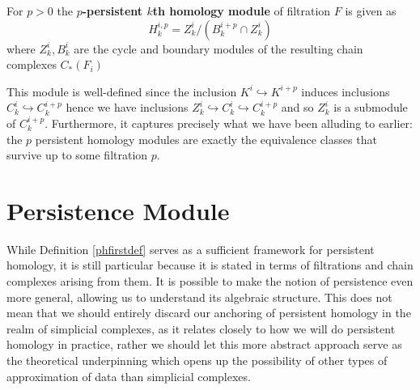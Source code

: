\begin{definition}\label{phfirstdef}
  For $p > 0$ the \textbf{$p$-persistent $k$th homology module} of filtration $F$ is given as
  \[H^{i,p}_{k} = Z^{i}_{k}/(B^{{i+p}}_{k} \cap Z^{i}_{k})\]
  where $Z^{i}_{k},B^{i}_{k}$ are the cycle and boundary modules of the resulting chain complexes $C_*(F_{i})$
\end{definition}
This module is well-defined since the inclusion $K^{i} \hookrightarrow K^{i+p}$ induces inclusions $C^{i}_{k} \hookrightarrow C_{k}^{i+p}$ hence we have inclusions $Z^{i}_{k} \hookrightarrow C^{i}_{k} \hookrightarrow C_{k}^{i+p}$ and so $Z^{i}_{k}$ is a submodule of $C^{i+p}_{k}$. Furthermore, it captures precisely what we have been alluding to earlier: the $p$ persistent homology modules are exactly the equivalence classes that survive up to some filtration $p$.


\section{Persistence Module}
While Definition \ref{phfirstdef} serves as a sufficient framework for persistent homology, it is still particular because it is stated in terms of filtrations and chain complexes arising from them. It is possible to make the notion of persistence even more general, allowing us to understand its algebraic structure. This does not mean that we should entirely discard our anchoring of persistent homology in the realm of simplicial complexes, as it relates closely to how we will do persistent homology in practice, rather we should let this more abstract approach serve as the theoretical underpinning which opens up the possibility of other types of approximation of data than simplicial complexes.

